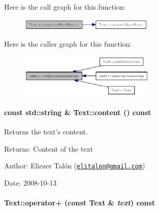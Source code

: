 Here is the call graph for this function:\nopagebreak
\begin{figure}[H]
\begin{center}
\leavevmode
\includegraphics[width=182pt]{class_text_e954a35628c72537e2ee5ca6e9609ac1_cgraph}
\end{center}
\end{figure}


Here is the caller graph for this function:\nopagebreak
\begin{figure}[H]
\begin{center}
\leavevmode
\includegraphics[width=184pt]{class_text_e954a35628c72537e2ee5ca6e9609ac1_icgraph}
\end{center}
\end{figure}
\hypertarget{class_text_8b6ac381338c5b3f719600b5f9be222c}{
\paragraph[{content}]{\setlength{\rightskip}{0pt plus 5cm}const std::string \& Text::content () const}\hfill}
\label{class_text_8b6ac381338c5b3f719600b5f9be222c}


Returns the text's content. 

\begin{Desc}
\item[Returns:]Content of the text\end{Desc}
\begin{Desc}
\item[Author:]Eliezer Talón (\href{mailto:elitalon@gmail.com}{\tt elitalon@gmail.com}) \end{Desc}
\begin{Desc}
\item[Date:]2008-10-13 \end{Desc}
\hypertarget{class_text_c8887fb224e0402448ede4f3b9f7452d}{
\paragraph[{operator+}]{ Text::operator+ (const {\bf Text} \& {\em text}) const}\hfill}
\label{class_text_c8887fb224e0402448ede4f3b9f7452d}


